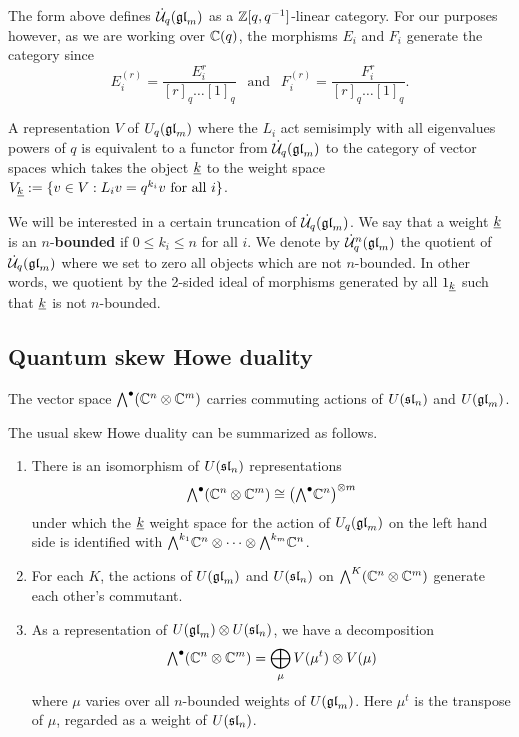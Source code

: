 \documentclass[11pt]{amsart}
\begin{document}
\begin{rem} 
The form above defines $\dU(\gl_m)$ as a $\bZ[q,q^{-1}]$-linear category. For our purposes however, as we are working over $\bC(q)$, the morphisms $E_i$ and $F_i$ generate the category since 
$$E_i^{(r)} = \frac{E_i^r}{[r]_q \dots [1]_q} \ \ \text{ and } \ \ F_i^{(r)} = \frac{F_i^r}{[r]_q \dots [1]_q}.$$
\end{rem}

A representation $ V $ of $ U_q(\gl_m) $ where the $ L_i $ act semisimply with all eigenvalues powers of $ q $ is equivalent to a functor from $ \dU(\gl_m) $ to the category of vector spaces which takes the object $ \ul{k} $ to the weight space $ V_{\ul{k}} := \{ v \in V : L_i v = q^{k_i} v \text{ for all } i \} $. 

We will be interested in a certain truncation of $ \dU(\gl_m) $.  We say that a weight $ \ul{k} $ is an $n$-\textbf{bounded} if $ 0 \le k_i \le n $ for all $ i$.  We denote by $\dU^n(\gl_m)$ the quotient of $\dU(\gl_m)$ where we set to zero all objects which are not $n$-bounded. In other words, we quotient by the 2-sided ideal of morphisms generated by all $ \one_{\ul{k}} $ such that $ \ul{k} $ is not $ n$-bounded.

\subsection{Quantum skew Howe duality}\label{sec:quantumskew}

The vector space $\Alt{\bullet}{}(\mathbb C^n \otimes \mathbb C^m)$ carries commuting actions of $U(\sl_n)$ and $U(\gl_m)$. 

\begin{thm}\mbox{}
The usual skew Howe duality can be summarized as follows.
\begin{enumerate}
\item There is an isomorphism of $ U(\sl_n) $ representations 
\begin{equation}
 \Alt{\bullet}{}(\mathbb C^n \otimes \mathbb C^m) \cong \left( \Alt{\bullet}{} \bC^n \right)^{\otimes m}
 \end{equation}
under which the $ \ul{k} $ weight space for the action of $ U_q(\gl_m) $ on the left hand side is identified with $\Alt{k_1}{} \mathbb C^n \otimes \cdots \otimes \Alt{k_m}{} \mathbb C^n$.
\item For each $ K $, the actions of $ U(\gl_m) $ and $ U(\sl_n) $ on $ \Alt{K}{}(\bC^n \otimes \bC^m) $ generate each other's commutant.
\item As a representation of $ U(\gl_m) \otimes U(\sl_n)$, we have a decomposition
$$ \Alt{\bullet}{} (\mathbb C^n \otimes \mathbb C^m) = \bigoplus_{\mu} V(\mu^t) \otimes V(\mu) $$
where $\mu$ varies over all $n$-bounded weights of $U(\gl_m)$. Here $\mu^t$ is the transpose of $\mu$, regarded as a weight of $U(\sl_n)$.
\end{enumerate}
\end{thm}
\end{document}

